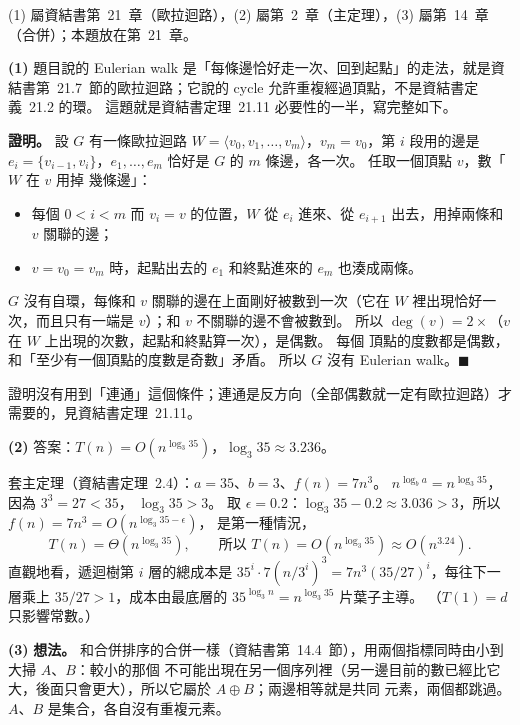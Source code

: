 \begin{pastsoln}
(1) 屬資結書第~21~章（歐拉迴路），(2) 屬第~2~章（主定理），(3) 屬第~14~章（合併）；本題放在第~21~章。

\textbf{(1)} 題目說的 Eulerian walk 是「每條邊恰好走一次、回到起點」的走法，就是資結書第~21.7~節的歐拉迴路；它說的
cycle 允許重複經過頂點，不是資結書定義~21.2 的環。 這題就是資結書定理~21.11 必要性的一半，寫完整如下。

\textbf{證明。} 設 $G$ 有一條歐拉迴路 $W = \langle v_0, v_1, \ldots, v_m \rangle$，$v_m = v_0$，第 $i$ 段用的邊是
$e_i = \{v_{i-1}, v_i\}$，$e_1, \ldots, e_m$ 恰好是 $G$ 的 $m$ 條邊，各一次。 任取一個頂點 $v$，數「$W$ 在 $v$ 用掉
幾條邊」：
\begin{itemize}
\item 每個 $0 < i < m$ 而 $v_i = v$ 的位置，$W$ 從 $e_i$ 進來、從 $e_{i+1}$ 出去，用掉兩條和 $v$ 關聯的邊；
\item $v = v_0 = v_m$ 時，起點出去的 $e_1$ 和終點進來的 $e_m$ 也湊成兩條。
\end{itemize}
$G$ 沒有自環，每條和 $v$ 關聯的邊在上面剛好被數到一次（它在 $W$ 裡出現恰好一次，而且只有一端是 $v$）；和 $v$
不關聯的邊不會被數到。 所以 $\deg(v) = 2 \times$（$v$ 在 $W$ 上出現的次數，起點和終點算一次），是偶數。 每個
頂點的度數都是偶數，和「至少有一個頂點的度數是奇數」矛盾。 所以 $G$ 沒有 Eulerian walk。\hfill$\blacksquare$

證明沒有用到「連通」這個條件；連通是反方向（全部偶數就一定有歐拉迴路）才需要的，見資結書定理~21.11。

\textbf{(2)} 答案：$T(n) = O(n^{\log_3 35})$，$\log_3 35 \approx 3.236$。

套主定理（資結書定理~2.4）：$a = 35$、$b = 3$、$f(n) = 7n^3$。 $n^{\log_b a} = n^{\log_3 35}$，因為 $3^3 = 27 < 35$，
$\log_3 35 > 3$。 取 $\epsilon = 0.2$：$\log_3 35 - 0.2 \approx 3.036 > 3$，所以 $f(n) = 7n^3 = O(n^{\log_3 35 - \epsilon})$，
是第一種情況，
\[
T(n) = \Theta(n^{\log_3 35}),\qquad \text{所以 } T(n) = O(n^{\log_3 35}) \approx O(n^{3.24}).
\]
直觀地看，遞迴樹第 $i$ 層的總成本是 $35^i \cdot 7(n/3^i)^3 = 7n^3 (35/27)^i$，每往下一層乘上 $35/27 > 1$，成本由最底層的
$35^{\log_3 n} = n^{\log_3 35}$ 片葉子主導。 （$T(1) = d$ 只影響常數。）

\textbf{(3)} \textbf{想法。} 和合併排序的合併一樣（資結書第~14.4~節），用兩個指標同時由小到大掃 $A$、$B$：較小的那個
不可能出現在另一個序列裡（另一邊目前的數已經比它大，後面只會更大），所以它屬於 $A \oplus B$；兩邊相等就是共同
元素，兩個都跳過。 $A$、$B$ 是集合，各自沒有重複元素。


\end{pastsoln}
